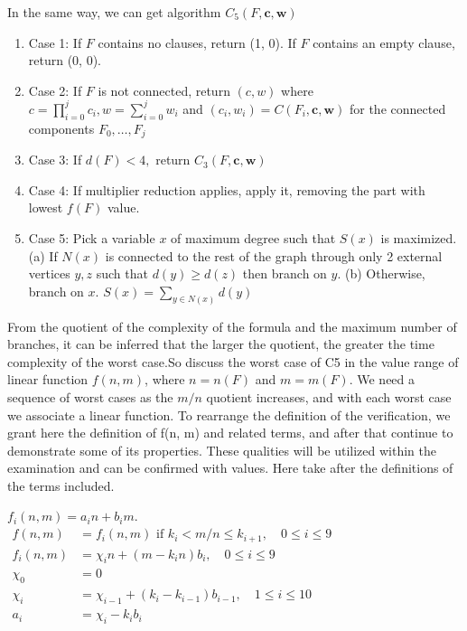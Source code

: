 \documentclass{sigchi}
\begin{document}
In the same way, we can get	algorithm $C_{5}(F, \mathbf{c}, \mathbf{w})$
\begin{enumerate}
	\item Case 1: If $F$ contains no clauses, return (1, 0). If $F$ contains an empty clause, return (0, 0).
	\item Case 2: If $F$ is not connected, return $(c, w)$ where $c=\prod_{i=0}^{j} c_{i}, w=\sum_{i=0}^{j} w_{i}$ and $\left(c_{i}, w_{i}\right)=C\left(F_{i}, \mathbf{c}, \mathbf{w}\right)$ for the connected components $F_{0}, \ldots, F_{j}$
	\item Case 3: If $d(F)<4,$ return $C_{3}(F, \mathbf{c}, \mathbf{w})$ 
	\item Case 4: If multiplier reduction applies, apply it, removing the part with lowest $f(F)$ value.
	\item Case 5: Pick a variable $x$ of maximum degree such that $S(x)$ is maximized. (a) If $N(x)$ is connected to the rest of the graph through only 2 external vertices $y, z$ such that $d(y) \geqslant d(z)$ then branch on $y .$
	(b) Otherwise, branch on $x .$
	$S(x)=\sum_{y \in N(x)} d(y)$
\end{enumerate}
From the quotient of the complexity of the formula and the maximum number of branches, it can be inferred that the larger the quotient, the greater the time complexity of the worst case.So discuss the worst case of C5 in the value range of linear function $f\left(n,m\right)$, where $n=n(F)$ and $m=m(F)$. 
We need a sequence of worst cases as the $m / n$ quotient increases, and with each worst case we associate a linear function. To rearrange the definition of the verification, we grant here the definition of f(n, m) and related terms, and after that continue to demonstrate some of its properties. These qualities will be utilized within the examination and can be confirmed with values. 
Here take after the deﬁnitions of the terms included.
\begin{center}
	$f_{i}(n, m)=a_{i} n+b_{i} m$. \\
	$\begin{aligned} f(n, m) &=f_{i}(n, m) \text { if } k_{i}<m / n \leqslant k_{i+1}, \quad 0 \leqslant i \leqslant 9 \\ f_{i}(n, m) &=\chi_{i} n+\left(m-k_{i} n\right) b_{i}, \quad 0 \leqslant i \leqslant 9 \\ \chi_{0} &=0 \\ \chi_{i} &=\chi_{i-1}+\left(k_{i}-k_{i-1}\right) b_{i-1}, \quad 1 \leqslant i \leqslant 10 \\ a_{i} &=\chi_{i}-k_{i} b_{i} \end{aligned}$\\
\end{center}
\end{document}
